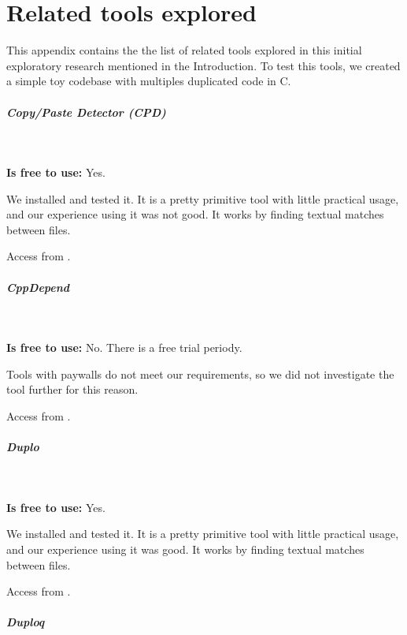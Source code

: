 \chapter{Related tools explored}

\label{app:gray}


This appendix contains the the list of related tools 
explored in this initial exploratory research mentioned
in the Introduction. To test this tools, we created a simple 
toy codebase with multiples duplicated code in C.

\paragraph{Copy/Paste Detector (CPD)} 

\

\textbf{Is free to use:} Yes.

We installed and tested it. It is a pretty primitive tool 
with little practical usage, and our experience using it 
was not good. It works by finding textual matches between files.

Access from \textit{}.

\paragraph{CppDepend}

\

\textbf{Is free to use:} No. There is a free trial periody.

Tools with paywalls do not meet our requirements, 
so we did not investigate the tool further for this reason.

Access from 
\textit{}.

\paragraph{Duplo}

\

\textbf{Is free to use:} Yes.

We installed and tested it. It is a pretty primitive tool 
with little practical usage, and our experience using it was good. 
It works by finding textual matches between files.

Access from
\textit{}.

\paragraph{Duploq}

